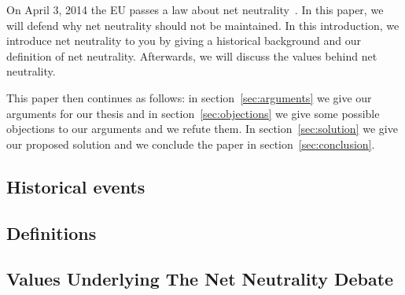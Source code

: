 
On April 3, 2014 the EU passes a law about net neutrality~\cite{whittaker2014eu}. In this paper, we will defend why net neutrality should not be maintained. In this introduction, we introduce net neutrality to you by giving a historical background and our definition of net neutrality. Afterwards, we will discuss the values behind net neutrality.

This paper then continues as follows: in section~\ref{sec:arguments} we give our arguments for our thesis and in section~\ref{sec:objections} we give some possible objections to our arguments and we refute them. In section~\ref{sec:solution} we give our proposed solution and we conclude the paper in section~\ref{sec:conclusion}.

\subsection{Historical events}
\label{sec:intro_problem}


\subsection{Definitions}
\label{sec:intro_def}


\subsection{Values Underlying The Net Neutrality Debate}
\label{sec:intro_values}
